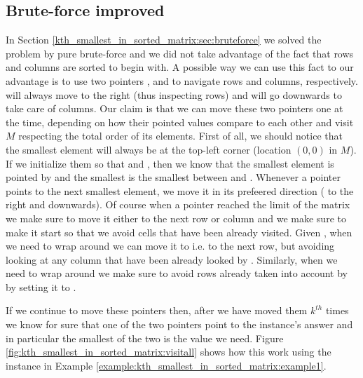 \subsection{Brute-force improved}
\label{kth_smallest_in_sorted_matrix:sec:bruteforce_constant_space}
In Section \ref{kth_smallest_in_sorted_matrix:sec:bruteforce} we solved the problem by pure brute-force and we did not take advantage of the fact that rows and columns are sorted to begin with. 
A possible way we can use this fact to our advantage is to use two pointers , and  to navigate rows and columns, respectively.  will always move to the right (thus inspecting rows) and  will go downwards to take care of columns. 
Our claim is that we can move these two pointers one at the time, depending on how their pointed values compare to each other and visit $M$ respecting the total order of its elements.
First of all, we should notice that the smallest element will always be at the top-left corner (location $(0,0)$ in $M$).
If we initialize them so that  and , then we know that the  smallest element is pointed by  and the  smallest is the smallest between   and . Whenever a pointer points to the next smallest element, we move it in its prefeered direction ( to the right and  downwards). Of course when a pointer reached the limit of the matrix we make sure to move it either to the next row or column and we make sure to make it start so that we avoid cells that have been already visited. Given , when we need to wrap around  we can move it to  i.e. to the next row, but avoiding looking at any column that have been already looked by . Similarly, when we need to wrap around  we make sure to avoid rows already taken into account by  by setting it to . 

If we continue to move these pointers then, after we have moved them $k^{th}$ times we know for sure that one of the two pointers point to the instance's answer and in particular the smallest of the two is the value we need.
Figure \ref{fig:kth_smallest_in_sorted_matrix:visitall} shows how this work using the instance in Example \ref{example:kth_smallest_in_sorted_matrix:example1}.

